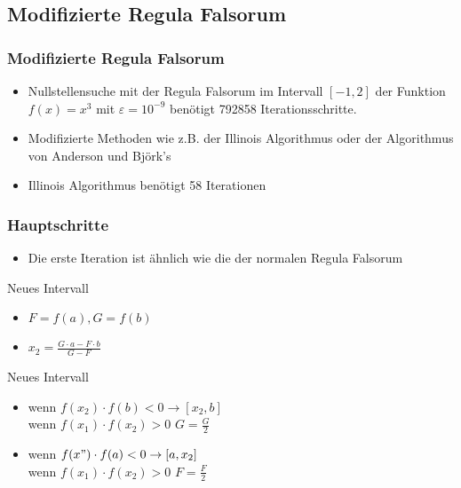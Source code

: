 \documentclass[table]{beamer}
\begin{document}
\subsection{Modifizierte Regula Falsorum}
\begin{frame}
\frametitle{Modifizierte Regula Falsorum}
\begin{itemize}
\item Nullstellensuche mit der Regula Falsorum im Intervall $[-1,2]$ der Funktion $f(x)=x^3$ mit $\varepsilon= 10^{-9}$  benötigt 792858 Iterationsschritte.
\item  Modifizierte Methoden wie z.B. der Illinois Algorithmus oder der Algorithmus von Anderson und Björk's
\item Illinois Algorithmus benötigt 58 Iterationen
\end {itemize}
\end{frame}	
\begin{frame}
\frametitle{Hauptschritte}
\begin{itemize}
\item Die erste Iteration ist ähnlich wie die der normalen Regula Falsorum

\end {itemize}

\begin{block}{Neues Intervall}
\begin{itemize}
\item $F=f(a), G=f(b)$
\item  $x_2 = \frac{G\cdot a - F\cdot b}{G - F}$
\end{itemize}
\end{block}
\begin{block}{Neues Intervall}
\begin{itemize}
\item wenn $f(x_2)\cdot f(b)<0 \to [x_2,b]$\\
wenn $ f(x_1) \cdot f(x_2) >0$  $ G=\frac{G}{2}$
\item wenn $f(x")\cdot f(a)< 0\to [a,x_2]$\\
wenn $f(x_1) \cdot f(x_2) >0$  $ F=\frac{F}{2}$
\end{itemize}
\end{block}
\end{frame}	
\end{document}
